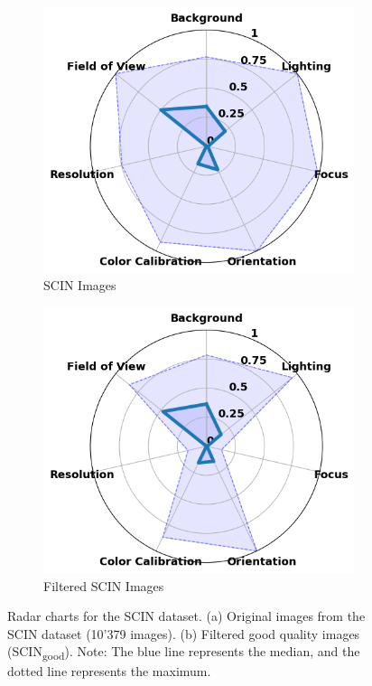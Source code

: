 \begin{figure}[ht]
    \centering
    \begin{subfigure}[b]{0.45\textwidth}
        \includegraphics[width=\textwidth]{img/hept/SCIN10k.png}
        \caption{SCIN Images}
        \label{fig:SCIN10k}
    \end{subfigure}
    \hfill
    \begin{subfigure}[b]{0.45\textwidth}
        \includegraphics[width=\textwidth]{img/hept/SCIN.png}
        \caption{Filtered SCIN Images}
        \label{fig:SCIN}
    \end{subfigure}
    \hfill
    \caption{Radar charts for the SCIN dataset. (a) Original images from the SCIN dataset (10'379 images). (b) Filtered good quality images (SCIN\textsubscript{good}). Note: The blue line represents the median, and the dotted line represents the maximum.}
    \label{fig:SF}
\end{figure}
\clearpage
\vspace{\baselineskip}

